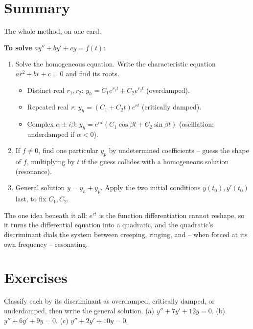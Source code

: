 \section{Summary}
\label{ch38:summary}

\begin{focusbox}
The whole method, on one card.

\textbf{To solve} $a y'' + b y' + c y = f(t)$:
\begin{enumerate}
  \item Solve the homogeneous equation. Write the characteristic equation $a r^2
  + b r + c = 0$ and find its roots.
  \begin{itemize}
    \item Distinct real $r_1, r_2$: \quad $y_h = C_1 e^{r_1 t} + C_2 e^{r_2 t}$
    (overdamped).
    \item Repeated real $r$: \quad $y_h = (C_1 + C_2 t)e^{rt}$ (critically damped).
    \item Complex $\alpha \pm i\beta$: \quad $y_h = e^{\alpha t}(C_1\cos\beta t +
    C_2\sin\beta t)$ (oscillation; underdamped if $\alpha < 0$).
  \end{itemize}
  \item If $f \neq 0$, find one particular $y_p$ by undetermined coefficients --
  guess the shape of $f$, multiplying by $t$ if the guess collides with a
  homogeneous solution (resonance).
  \item General solution $y = y_h + y_p$. Apply the two initial conditions
  $y(t_0), y'(t_0)$ last, to fix $C_1, C_2$.
\end{enumerate}
The one idea beneath it all: $e^{rt}$ is the function differentiation cannot
reshape, so it turns the differential equation into a quadratic, and the quadratic's
discriminant dials the system between creeping, ringing, and -- when forced at its
own frequency -- resonating.
\end{focusbox}

\section{Exercises}
\label{ch38:exercises}

\begin{exercise}
\label{ch38:ex-1}
Classify each by its discriminant as overdamped, critically damped, or
underdamped, then write the general solution.
(a) $y'' + 7y' + 12y = 0$. \quad
(b) $y'' + 6y' + 9y = 0$. \quad
(c) $y'' + 2y' + 10y = 0$.
\end{exercise}

